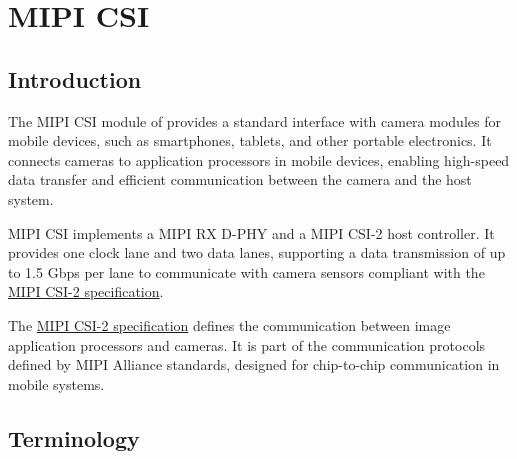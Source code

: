 \documentclass[main\_\_EN.tex]{subfiles}
\begin{document}

\ifglobal
\else
    {\let\clearpage\relax \listoftodos}
    {\let\clearpage\relax \listofdonetodos}
    \tableofcontents
\fi



\hypertarget{mipicsi}{}
\chapter{MIPI CSI}
\label{mod:mipicsi}



\section{Introduction}

The MIPI CSI module of \chipname{} provides a standard interface with camera modules for mobile devices, such as smartphones, tablets, and other portable electronics. It connects cameras to application processors in mobile devices, enabling high-speed data transfer and efficient communication between the camera and the host system.

\chipname{} MIPI CSI implements a MIPI RX D-PHY and a MIPI CSI-2 host controller. It provides one clock lane and two data lanes, supporting a data transmission of up to 1.5 Gbps per lane to communicate with camera sensors compliant with the \hyperlink{https://www.mipi.org/specifications/csi-2}{MIPI CSI-2 specification}.

\begin{tiplisting}
The \hyperlink{https://www.mipi.org/specifications/csi-2}{MIPI CSI-2 specification} defines the communication between image application processors and cameras. It is part of the communication protocols defined by MIPI Alliance standards, designed for chip-to-chip communication in mobile systems.
\end{tiplisting}



\section{Terminology}
\end{document}
